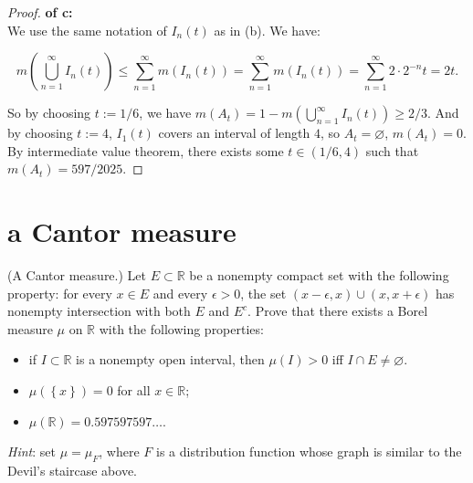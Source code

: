 \documentclass{qlnotes-export}
\begin{document}
\begin{proof}

\textbf{of c:\\
}{ }We use the same notation of \(I_{n}(t)\) as in (b). We have:

\[m(\bigcup\limits_{n = 1}^{\infty}I_{n}(t)) \leq \sum\limits_{n = 1}^{\infty}m(I_{n}(t)) = \sum\limits_{n = 1}^{\infty}m(I_{n}(t)) = \sum\limits_{n = 1}^{\infty}2 \cdot 2^{- n}t = 2t.\]

So by choosing \(t := 1/6\), we have \(m(A_{t}) = 1 - m(\bigcup_{n = 1}^{\infty}I_{n}(t)) \geq 2/3\). And by choosing \(t := 4\), \(I_{1}(t)\) covers an interval of length \(4\), so \(A_{t} = \varnothing\), \(m(A_{t}) = 0\). By intermediate value theorem, there exists some \(t \in (1/6,4)\) such that \(m(A_{t}) = 597/2025\).

\end{proof}

\section{a Cantor measure}\label{a-cantor-measure}

(A Cantor measure.) Let \(E \subset {\mathbb{R}}\) be a nonempty compact set with the following property: for every \(x \in E\) and every \(\epsilon > 0\), the set \((x - \epsilon,x) \cup (x,x + \epsilon)\) has nonempty intersection with both \(E\) and \(E^{c}\). Prove that there exists a Borel measure \(\mu\) on \(\mathbb{R}\) with the following properties:

\begin{itemize}
\item
  if \(I \subset {\mathbb{R}}\) is a nonempty open interval, then \(\mu(I) > 0\) iff \(I \cap E \neq \varnothing\).
\item
  \(\mu(\left\{ x \right\}) = 0\) for all \(x \in {\mathbb{R}}\);
\item
  \(\mu({\mathbb{R}}) = 0.597597597\ldots\).
\end{itemize}

\emph{Hint}: set \(\mu = \mu_{F}\), where \(F\) is a distribution function whose graph is similar to the Devil's staircase above.
\end{document}
